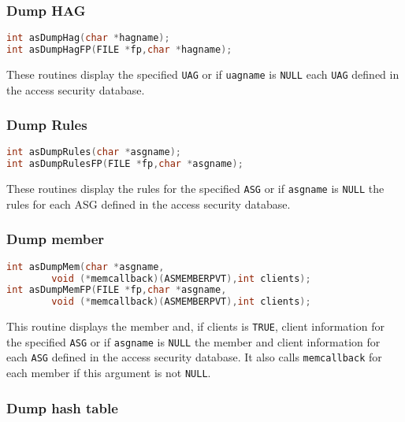 \subsubsection{Dump HAG}

\begin{lstlisting}[language=C]
int asDumpHag(char *hagname);
int asDumpHagFP(FILE *fp,char *hagname);
\end{lstlisting}

These routines display the specified \verb|UAG| or if \verb|uagname| is \verb|NULL| each \verb|UAG| defined in the access security database.

\subsubsection{Dump Rules}

\begin{lstlisting}[language=C]
int asDumpRules(char *asgname);
int asDumpRulesFP(FILE *fp,char *asgname);
\end{lstlisting}

These routines display the rules for the specified \verb|ASG| or if \verb|asgname| is \verb|NULL| the rules for each ASG defined in the 
access security database.

\subsubsection{Dump member}

\begin{lstlisting}[language=C]
int asDumpMem(char *asgname,
        void (*memcallback)(ASMEMBERPVT),int clients);
int asDumpMemFP(FILE *fp,char *asgname,
        void (*memcallback)(ASMEMBERPVT),int clients);
\end{lstlisting}

This routine displays the member and, if clients is \verb|TRUE|, client information for the specified \verb|ASG| or if \verb|asgname| is \verb|NULL| the member and client information for each \verb|ASG| defined in the access security database.
It also calls \verb|memcallback| for each member if this argument is not \verb|NULL|.

\subsubsection{Dump hash table}

